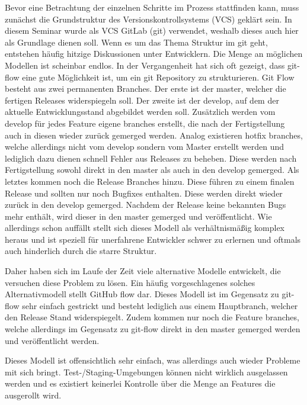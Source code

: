 Bevor eine Betrachtung der einzelnen Schritte im Prozess stattfinden kann, muss zunächst die Grundstruktur des Versionskontrollsystems (VCS) geklärt sein.
In diesem Seminar wurde als VCS GitLab (git) verwendet, weshalb dieses auch hier als Grundlage dienen soll.
Wenn es um das Thema Struktur im git geht, entstehen häufig hitzige Diskussionen unter Entwicklern.
Die Menge an möglichen Modellen ist scheinbar endlos.
In der Vergangenheit hat sich oft gezeigt, dass git-flow\cite{SuccessfulGitBranching} eine gute Möglichkeit ist, um ein git Repository zu strukturieren.
Git Flow besteht aus zwei permanenten Branches.
Der erste ist der master, welcher die fertigen Releases widerspiegeln soll.
Der zweite ist der develop, auf dem der aktuelle Entwicklungsstand abgebildet werden soll.
Zusätzlich werden vom develop für jedes Feature eigene branches erstellt, die nach der Fertigstellung auch in diesen wieder zurück gemerged werden.
Analog existieren hotfix branches, welche allerdings nicht vom develop sondern vom Master erstellt werden und lediglich dazu dienen schnell Fehler aus Releases zu beheben.
Diese werden nach Fertigstellung sowohl direkt in den master als auch in den develop gemerged.
Als letztes kommen noch die Release Branches hinzu.
Diese führen zu einem finalen Release und sollten nur noch Bugfixes enthalten.
Diese werden direkt wieder zurück in den develop gemerged.
Nachdem der Release keine bekannten Bugs mehr enthält, wird dieser in den master gemerged und veröffentlicht.
Wie allerdings schon auffällt stellt sich dieses Modell als verhältnismäßig komplex heraus und ist speziell für unerfahrene Entwickler schwer zu erlernen und oftmals auch hinderlich durch die starre Struktur.

Daher haben sich im Laufe der Zeit viele alternative Modelle entwickelt, die versuchen diese Problem zu lösen.
Ein häufig vorgeschlagenes solches Alternativmodell stellt GitHub flow\cite{UnderstandingGitHubFlow} dar.
Dieses Modell ist im Gegensatz zu git-flow sehr einfach gestrickt und besteht lediglich aus einem Hauptbranch, welcher den Release Stand widerspiegelt.
Zudem kommen nur noch die Feature branches, welche allerdings im Gegensatz zu git-flow direkt in den master gemerged werden und veröffentlicht werden.

Dieses Modell ist offensichtlich sehr einfach, was allerdings auch wieder Probleme mit sich bringt.
Test-/Staging-Umgebungen können nicht wirklich ausgelassen werden und es existiert keinerlei Kontrolle über die Menge an Features die ausgerollt wird.


